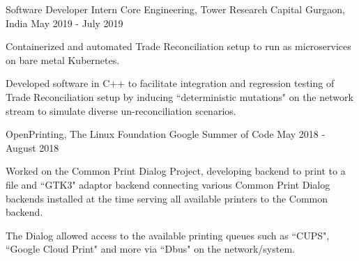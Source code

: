 

\begin{cventries}


  \cventry
    {Software Developer Intern} %
    {Core Engineering, Tower Research Capital} %
    {Gurgaon, India} %
    {May 2019 - July 2019} %
    {
      \begin{cvitems} %
        \item {Containerized and automated Trade Reconciliation setup to run as microservices on bare metal Kubernetes.}
        \item {Developed software in C++ to facilitate integration and regression testing of Trade Reconciliation setup by inducing ``deterministic mutations" on the network stream to simulate diverse un-reconciliation scenarios.}
      \end{cvitems}
    }


  \cventry
    {OpenPrinting, The Linux Foundation} %
    {Google Summer of Code} %
    {} %
    {May 2018 - August 2018} %
    {
      \begin{cvitems} %
        \item {Worked on the Common Print Dialog Project, developing backend to print to a file and ``GTK3" adaptor backend connecting various Common Print Dialog backends installed at the time serving all available printers to the Common backend.}
        \item {The Dialog allowed access to the available printing queues such as ``CUPS", ``Google Cloud Print" and more via ``Dbus" on the network/system.}
      \end{cvitems}
    }


\end{cventries}
